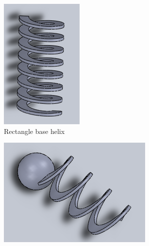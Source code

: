 \documentclass[12pt,a4paper,titlepage]{report}
\begin{document}
\begin{figure}
\begin{subfigure}[b]{0.32\textwidth}
                \includegraphics[width=\textwidth]{Design3}
                \caption{Rectangle base helix}
                \label{Design3}
        \end{subfigure}
        \begin{subfigure}[b]{0.335\textwidth}
                \includegraphics[width=\textwidth]{Design4}

\end{subfigure}
\end{figure}
\end{document}

